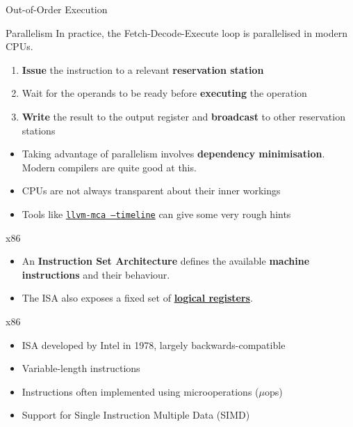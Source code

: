 \documentclass{beamer}
\begin{document}
\begin{frame}{Out-of-Order Execution}
	\begin{block}{Parallelism}
		In practice, the Fetch-Decode-Execute loop is parallelised in modern CPUs.

		\begin{enumerate}
			\item \textbf{Issue} the instruction to a relevant \textbf{reservation station}
			\item Wait for the operands to be ready before \textbf{executing} the operation
			\item \textbf{Write} the result to the output register and \textbf{broadcast} to other reservation stations
		\end{enumerate}
	\end{block}

	\pause
	\begin{itemize}
		\item Taking advantage of parallelism involves \textbf{dependency minimisation}. Modern compilers are quite good at this.

		\item CPUs are not always transparent about their inner workings
		\item Tools like \href{https://godbolt.org/z/8P6jKv81c}{\texttt{llvm-mca --timeline}} can give some very rough hints
	\end{itemize}
\end{frame}



\begin{frame}{x86}
	\begin{itemize}
		\item An \textbf{Instruction Set Architecture} defines the available \textbf{machine instructions} and their behaviour.

		\item The ISA also exposes a fixed set of \href{https://en.wikibooks.org/wiki/X86_Assembly/X86_Architecture}{\textbf{logical registers}}.
	\end{itemize}

	\pause
	\begin{block}{x86}
		\begin{itemize}
			\item ISA developed by Intel in 1978, largely backwards-compatible
			\item Variable-length instructions%
			\item Instructions often implemented using microoperations ($\mu$ops)
			\item Support for Single Instruction Multiple Data (SIMD)
		\end{itemize}
	\end{block}
\end{frame}
\end{document}
